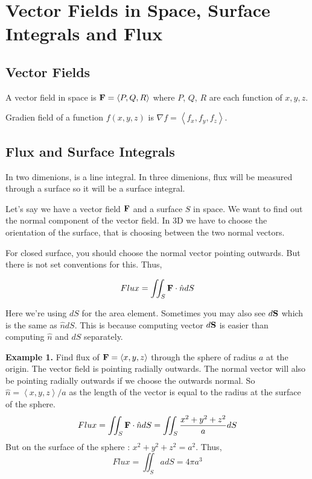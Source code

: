 

\chapter{Vector Fields in Space, Surface Integrals and Flux} 

\bigbreak

\section{Vector Fields}

A vector field in space is ${\bf F} = \left< P, Q, R \right>$ where $P$, $Q$, $R$ are each function of $x, y, z$.

Gradien field of a function $f(x, y, z)$ is $\nabla f = \left< f_x, f_y, f_z \right>$.

\section{Flux and Surface Integrals}

In two dimenions,  is a line integral.
In three dimenions, flux will be measured through a surface so it will be a surface integral.

Let's say we have a vector field ${\bf F}$ and a surface $S$ in space.
We want to find out the normal component of the vector field.
In 3D we have to choose the orientation of the surface, that is choosing between the two normal vectors.

For closed surface, you should choose the normal vector pointing outwards. 
But there is not set conventions for this. Thus, 

$$ Flux = \iint_S {\bf F} \cdot \hat{n} dS $$

Here we're using $dS$ for the area element. 
Sometimes you may also see $d{\bf S}$ which is the same as $\hat{n} dS$.
This is because computing vector $d{\bf S}$ is easier than computing $\hat{n}$ and $dS$ separately.

{\bf Example 1.} Find flux of  ${\bf F} = \left< x, y, z \right>$ through the sphere of radius $a$ at the origin.
The vector field is pointing radially outwards. 
The normal vector will also be pointing radially outwards if we choose the outwards normal.
So $\hat{n} = \left< x, y, z \right> / a$ as the length of the vector is equal to the radius at the surface of the sphere.
$$
Flux = \iint_S {\bf F} \cdot \hat{n} dS = \iint_S \frac{x^2+y^2+z^2}{a} dS 
$$
But on the surface of the sphere : $x^2 + y^2 + z^2 = a^2$. Thus,
$$
Flux = \iint_S a dS = 4 \pi a^3
$$

